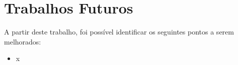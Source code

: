 \chapter{Trabalhos Futuros}

A partir deste trabalho, foi possível identificar os seguintes pontos a serem melhorados:
\begin{itemize}
 \item x
\end{itemize}
